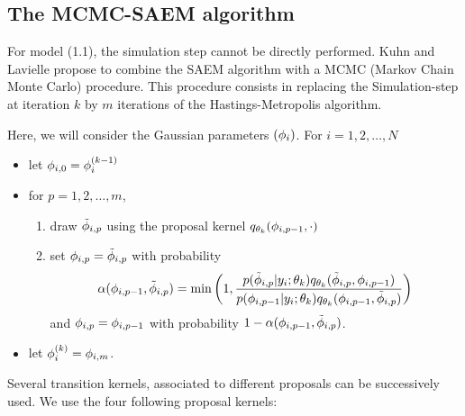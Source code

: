 \subsection{The MCMC-SAEM algorithm}
For model (1.1), the simulation step cannot be directly performed. Kuhn and Lavielle \cite{Kuhn01} propose to combine the SAEM algorithm with a MCMC (Markov Chain Monte Carlo) procedure. This procedure consists in replacing the Simulation-step at iteration $k$ by $m$ iterations of the Hastings-Metropolis algorithm.

Here, we will consider the Gaussian parameters $({{\phi}_i})$. For $i=1,2,\ldots,N$
\begin{itemize}
\item let ${\phi}_{i,0}={\phi}_{i}^{(k-1)}$
\item for $p=1,2,\ldots,m$,
\begin{enumerate}
\item draw $ \tilde{{\phi}}_{i,p}$ using the proposal kernel
$ q_{\theta_k}( {\phi}_{i,p-1} ,\cdot) $
\item set $ {\phi}_{i,p} =  \tilde{{\phi}}_{i,p} $ with probability
$$ \alpha( {\phi}_{i,p-1} ,  \tilde{{\phi}}_{i,p} ) = \min \left(1, \frac
{ p( \tilde{{\phi}}_{i,p} |y_i;\theta_k) q_{\theta_k}(\tilde{{\phi}}_{i,p} , {\phi}_{i,p-1} )}
{ p( {\phi}_{i,p-1} |y_i;\theta_k) q_{\theta_k}({\phi}_{i,p-1} ,\tilde{{\phi}}_{i,p} )} \right)$$ and
${\phi}_{i,p} =  {\phi}_{i,p-1}$ with probability $1- \alpha( {\phi}_{i,p-1} ,  \tilde{{\phi}}_{i,p} ) $.
\end{enumerate}
\item let ${\phi}_i^{(k)} =  {\phi}_{i,m}$.
 \end{itemize}

Several transition kernels, associated to different proposals can be successively used. We use the four following proposal kernels:

